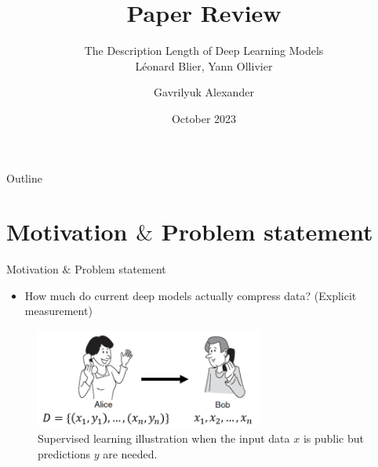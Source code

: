 \documentclass[10pt, handout, envcountsect]{beamer} %
\title[Paper Review]{Paper Review}
\subtitle{
\large{The Description Length of Deep Learning Models}
\\
\vspace{3pt}
\normalsize{Léonard Blier, Yann Ollivier}
}
\author{Gavrilyuk Alexander}
\date{October 2023}
\begin{document}
\maketitle


\begin{frame}{Outline}

\tableofcontents

\end{frame}

\section{Motivation $\&$ Problem statement}

\begin{frame}{Motivation $\&$ Problem statement}
\begin{itemize}
    \item How much do current deep models actually compress data? (Explicit measurement)
\end{itemize}


\begin{figure}[h]
    \centering
    \includegraphics[width=7.5cm,]{fig1.png}
    \caption{Supervised learning illustration when the input data $x$ is public but predictions $y$ are needed.}
\end{figure} 
    
\end{frame}
\end{document}
